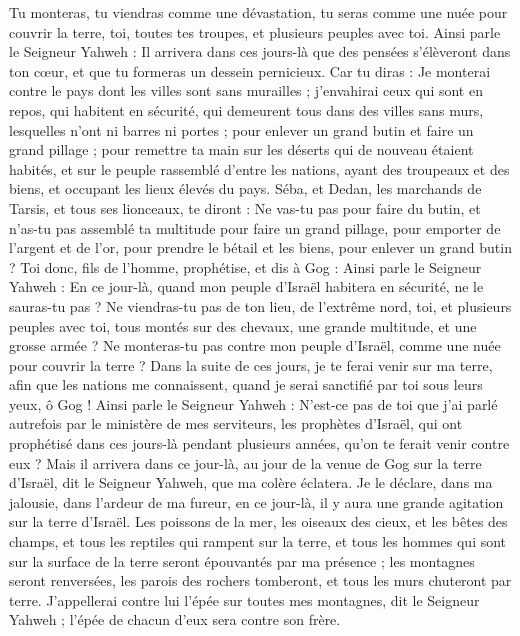 \begin{multicols}{2}
Tu monteras, tu viendras comme une dévastation, tu seras comme une nuée pour couvrir la terre, toi, toutes tes troupes, et plusieurs peuples avec toi.
Ainsi parle le Seigneur Yahweh : Il arrivera dans ces jours-là que des pensées s’élèveront dans ton cœur, et que tu formeras un dessein pernicieux.
Car tu diras : Je monterai contre le pays dont les villes sont sans murailles ; j'envahirai ceux qui sont en repos, qui habitent en sécurité, qui demeurent tous dans des villes sans murs, lesquelles n'ont ni barres ni portes ;
pour enlever un grand butin et faire un grand pillage ; pour remettre ta main sur les déserts qui de nouveau étaient habités, et sur le peuple rassemblé d'entre les nations, ayant des troupeaux et des biens, et occupant les lieux élevés du pays.
Séba, et Dedan, les marchands de Tarsis, et tous ses lionceaux, te diront : Ne vas-tu pas pour faire du butin, et n'as-tu pas assemblé ta multitude pour faire un grand pillage, pour emporter de l'argent et de l'or, pour prendre le bétail et les biens, pour enlever un grand butin ?
Toi donc, fils de l’homme, prophétise, et dis à Gog : Ainsi parle le Seigneur Yahweh : En ce jour-là, quand mon peuple d'Israël habitera en sécurité, ne le sauras-tu pas ?
Ne viendras-tu pas de ton lieu, de l’extrême nord, toi, et plusieurs peuples avec toi, tous montés sur des chevaux, une grande multitude, et une grosse armée ?
Ne monteras-tu pas contre mon peuple d'Israël, comme une nuée pour couvrir la terre ? Dans la suite de ces jours, je te ferai venir sur ma terre, afin que les nations me connaissent, quand je serai sanctifié par toi sous leurs yeux, ô Gog !
Ainsi parle le Seigneur Yahweh : N'est-ce pas de toi que j'ai parlé autrefois par le ministère de mes serviteurs, les prophètes d'Israël, qui ont prophétisé dans ces jours-là pendant plusieurs années, qu'on te ferait venir contre eux ?
Mais il arrivera dans ce jour-là, au jour de la venue de Gog sur la terre d'Israël, dit le Seigneur Yahweh, que ma colère éclatera.
Je le déclare, dans ma jalousie, dans l'ardeur de ma fureur, en ce jour-là, il y aura une grande agitation sur la terre d'Israël.
Les poissons de la mer, les oiseaux des cieux, et les bêtes des champs, et tous les reptiles qui rampent sur la terre, et tous les hommes qui sont sur la surface de la terre seront épouvantés par ma présence ; les montagnes seront renversées, les parois des rochers tomberont, et tous les murs chuteront par terre.
J'appellerai contre lui l'épée sur toutes mes montagnes, dit le Seigneur Yahweh ; l'épée de chacun d'eux sera contre son frère.

\end{multicols}
